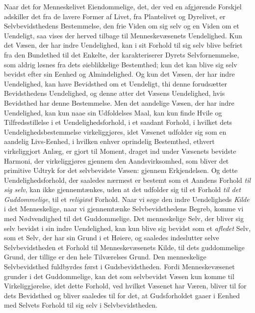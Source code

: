 \documentclass[12pt,a4paper,openany]{book}
\newcommand{\opage}[1]{\marginnote{\footnotesize\textit{[#1]}}}
\begin{document}
Naar det for Menneskelivet Eiendommelige, det, der ved
en afgjørende Forskjel adskiller det fra de lavere Former af
Livet, fra Plantelivet og Dyrelivet, er Selvbevidsthedens
Bestemmelse, den frie Viden om sig selv og en Viden om et
Uendeligt, saa vises der herved tilbage til Menneskevæsenets
Uendelighed. Kun det Væsen, der har indre Uendelighed,
kan i sit Forhold til sig selv blive befriet fra den Bundethed
til det Enkelte, der karakteriserer Dyrets Selvfornemmelse,
som aldrig løsnes fra dets øieblikkelige Bestemthed; kun det
kan blive sig selv bevidst efter sin Eenhed og Almindelighed.
Og kun det Væsen, der har indre Uendelighed, kan have
Bevidsthed om et Uendeligt, thi denne forudsætter Bevidsthedens
Uendelighed, og denne atter det Væsens Uendelighed, hvis
Bevidsthed har denne Bestemmelse. Men det aandelige Væsen,
der har indre Uendelighed, kan kun naae sin Udfoldelses Maal,
kan kun finde Hvile og Tilfredsstillelse i et Uendelighedsforhold,
i et saadant Forhold, i hvilket dets Uendelighedsbestemmelse
virkeliggjøres, idet Væsenet udfolder sig som en aandelig
Livs-Eenhed, i hvilken enhver oprindelig Bestemthed, ethvert
virkeliggjort Anlæg, er gjort til Moment, draget ind under
\opage{499}Væsenets bevidste Harmoni, der virkeliggjøres gjennem den
Aandsvirksomhed, som bliver det primitive Udtryk for det selvbevidste
Væsen: gjennem Erkjendelsen. Og dette Uendelighedsforhold,
der saaledes nærmest er bestemt som et Aandens Forhold
\emph{til sig selv}, kan ikke gjennemtænkes, uden at det udfolder sig
til et Forhold \emph{til det Guddommelige}, til et \emph{religiøst}
Forhold. Naar vi søge den indre Uendeligheds \emph{Kilde} i
det Menneskelige, naar vi gjennemtænke Selvbevidsthedens
Begreb, komme vi med Nødvendighed til det Guddommelige.
Det menneskelige Selv, der bliver sig selv bevidst i sin indre
Uendelighed, kan kun blive sig bevidst som et \emph{afledet} Selv,
som et Selv, der har sin Grund i et Høiere, og saaledes indeslutter
selve Selvbevidstheden et Forhold til Menneskevæsenets
Kilde, til dets guddommelige Grund, der tillige er den hele Tilværelses
Grund. Den menneskelige Selvbevidsthed fuldbyrdes
først i Gudsbevidstheden. Fordi Menneskevæsenet grunder
i det Guddommelige, kan det som selvbevidst Væsen kun
komme til Virkeliggjørelse, idet dette Forhold, ved hvilket
Væsenet har Væren, bliver til for dets Bevidsthed og bliver
saaledes til for det, at Gudsforholdet gaaer i Eenhed med
Selvets Forhold til sig selv i Selvbevidstheden.
\end{document}
